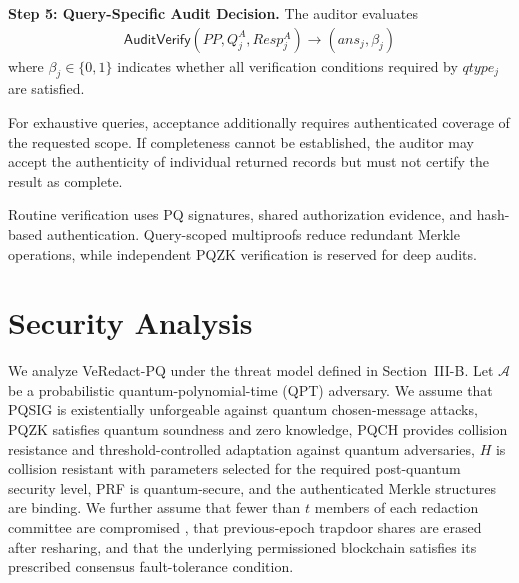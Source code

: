 \documentclass[lettersize,journal]{IEEEtran}
\begin{document}
    \medskip
    \noindent\textbf{Step 5: Query-Specific
    Audit Decision.}
    The auditor evaluates
    \begin{equation}
    \begin{aligned}
    \mathsf{AuditVerify}
    (PP,Q_j^A,Resp_j^A)
    \rightarrow
    (ans_j,\beta_j)
    \end{aligned}
    \end{equation}
    where $\beta_j\in\{0,1\}$ indicates
    whether all verification conditions
    required by $qtype_j$ are satisfied.
    
    For exhaustive queries, acceptance
    additionally requires authenticated
    coverage of the requested scope.
    If completeness cannot be established,
    the auditor may accept the authenticity
    of individual returned records but
    must not certify the result as complete.
    
    Routine verification uses PQ signatures,
    shared authorization evidence, and
    hash-based authentication. Query-scoped
    multiproofs reduce redundant Merkle
    operations, while independent PQZK
    verification is reserved for deep audits.
    
    
    
    
    
    
    \section{Security Analysis}
    \label{sec:security}
    
    We analyze VeRedact-PQ under the threat model defined in
    Section~III-B. Let $\mathcal{A}$ be a probabilistic
    quantum-polynomial-time (QPT) adversary. We assume that PQSIG is
    existentially unforgeable against quantum chosen-message attacks,
    PQZK satisfies quantum soundness and zero knowledge, PQCH provides
    collision resistance and threshold-controlled adaptation against
    quantum adversaries, $H$ is collision resistant with parameters
    selected for the required post-quantum security level, PRF is
    quantum-secure, and the authenticated Merkle structures are binding.
    We further assume that fewer than $t$ members of each redaction
    committee are compromised {, that previous-epoch trapdoor
    shares are erased after resharing,} and that the underlying permissioned
    blockchain satisfies its prescribed consensus fault-tolerance
    condition.
    
\end{document}

